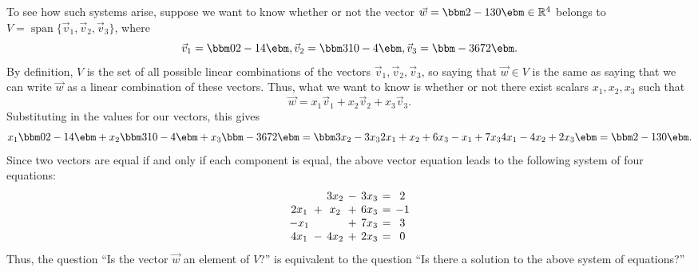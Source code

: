 To see how such systems arise, suppose we want to know whether or not the vector $\vec w = \bbm 2\\-1\\3\\0\ebm \in\mathbb{R}^4$ belongs to 
 $V = \operatorname{span}\{\vec{v}_1, \vec{v}_2, \vec{v}_3\}$, where
\[
\vec{v}_1 = \bbm 0\\2\\-1\\4\ebm, \vec{v}_2 = \bbm 3\\1\\0\\-4\ebm, \vec{v}_3 = \bbm -3\\6\\7\\2\ebm.
\]
By definition, $V$ is the set of all possible linear combinations of the vectors $\vec{v}_1, \vec{v}_2, \vec{v}_3$, so saying that $\vec w \in V$ is the same as saying that we can write $\vec w$ as a linear combination of these vectors. Thus, what we want to know is whether or not there exist scalars $x_1, x_2, x_3$ such that
\[
\vec w = x_1\vec{v}_1 + x_2\vec{v}_2 + x_3\vec{v}_3.
\]
Substituting in the values for our vectors, this gives
\[
x_1\bbm 0\\2\\-1\\4\ebm + x_2\bbm 3\\1\\0\\-4\ebm + x_3\bbm -3\\6\\7\\2\ebm  = \bbm 3x_2-3x_3\\2x_1+x_2+6x_3\\-x_1+7x_3\\4x_1-4x_2+2x_3\ebm = \bbm 2\\-1\\3\\0\ebm .
\]
Since two vectors are equal if and only if each component is equal, the above vector equation leads to the following system of four equations:
\[\arraycolsep=2pt
\begin{array}{ccccccc}
 & &3x_2&-&3x_3&=&2\\
2x_1&+&x_2&+&6x_3&=&-1\\
-x_1& & &+&7x_3&=&3\\
4x_1&-&4x_2&+&2x_3&=&0
\end{array}
\]
Thus, the question ``Is the vector $\vec w$ an element of $V$?'' is equivalent to the question ``Is there a solution to the above system of equations?'' 

